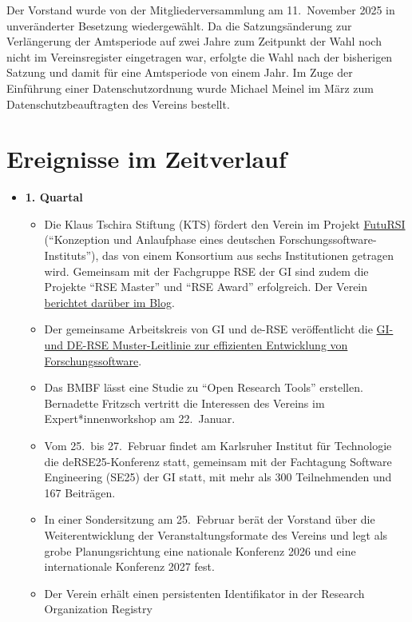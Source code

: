 Der Vorstand wurde von der Mitgliederversammlung am 11.~November 2025 in unveränderter Besetzung
wiedergewählt. Da die Satzungsänderung zur Verlängerung der Amtsperiode auf zwei Jahre zum Zeitpunkt
der Wahl noch nicht im Vereinsregister eingetragen war, erfolgte die Wahl nach der bisherigen Satzung
und damit für eine Amtsperiode von einem Jahr. Im Zuge der Einführung einer Datenschutzordnung wurde
Michael Meinel im März zum Datenschutzbeauftragten des Vereins bestellt.

\clearpage
\section{Ereignisse im Zeitverlauf}

\begin{itemize}
 \item[] \textbf{1. Quartal}
   \begin{itemize}
     \item Die Klaus Tschira Stiftung (KTS) fördert den Verein im Projekt
       \href{https://www.futursi.de/}{FutuRSI} ("`Konzeption und Anlaufphase eines deutschen
       Forschungssoftware-Instituts"'), das von einem Konsortium aus sechs Institutionen getragen wird.
       Gemeinsam mit der Fachgruppe RSE der GI sind zudem die Projekte "`RSE Master"' und
       "`RSE Award"' erfolgreich. Der Verein
       \href{https://de-rse.org/blog/2025/01/20/kts_foerderung.html}{berichtet darüber im Blog}.
     \item Der gemeinsame Arbeitskreis von GI und de-RSE veröffentlicht die
       \href{https://doi.org/10.18420/2025-gi_de-rse}{\glqq GI- und DE-RSE Muster-Leitlinie zur effizienten
       Entwicklung von Forschungssoftware\grqq}.
     \item Das BMBF lässt eine Studie zu "`Open Research Tools"' erstellen. Bernadette Fritzsch
       vertritt die Interessen des Vereins im Expert*innenworkshop am 22.~Januar.
     \item Vom 25.\ bis 27.~Februar findet am Karlsruher Institut für Technologie die deRSE25-Konferenz
       statt, gemeinsam mit der Fachtagung Software Engineering (SE25) der GI statt, mit mehr als 300 Teilnehmenden und 167 Beiträgen.
     \item In einer Sondersitzung am 25.~Februar berät der Vorstand über die Weiterentwicklung der
       Veranstaltungsformate des Vereins und legt als grobe Planungsrichtung eine nationale Konferenz
       2026 und eine internationale Konferenz 2027 fest.
     \item Der Verein erhält einen persistenten Identifikator in der Research Organization Registry

\end{itemize}
\end{itemize}
